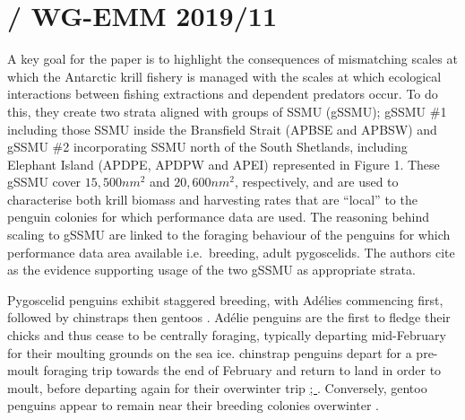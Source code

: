 \documentclass[]{elsarticle} %
\begin{document}
\section{\texorpdfstring{\citet{Watters2020} / WG-EMM
2019/11}{@Watters2020 / WG-EMM 2019/11}}\label{watters2020-wg-emm-201911}

A key goal for the paper is to highlight the consequences of mismatching
scales at which the Antarctic krill fishery is managed with the scales
at which ecological interactions between fishing extractions and
dependent predators occur. To do this, they create two strata aligned
with groups of SSMU (gSSMU); gSSMU \#1 including those SSMU inside the
Bransfield Strait (APBSE and APBSW) and gSSMU \#2 incorporating SSMU
north of the South Shetlands, including Elephant Island (APDPE, APDPW
and APEI) represented in Figure 1. These gSSMU cover \(15,500nm^2\) and
\(20,600nm^2\), respectively, and are used to characterise both krill
biomass and harvesting rates that are ``local'' to the penguin colonies
for which performance data are used. The reasoning behind scaling to
gSSMU are linked to the foraging behaviour of the penguins for which
performance data area available i.e.~breeding, adult pygoscelids. The
authors cite \citet{Hinke2017} as the evidence supporting usage of the
two gSSMU as appropriate strata.

Pygoscelid penguins exhibit staggered breeding, with Adélies commencing
first, followed by chinstraps then gentoos \citep{Black2016}. Adélie
penguins are the first to fledge their chicks and thus cease to be
centrally foraging, typically departing mid-February for their moulting
grounds on the sea ice. chinstrap penguins depart for a pre-moult
foraging trip towards the end of February and return to land in order to
moult, before departing again for their overwinter trip
\href{Figure\%202}{\citet{Hinke2015}; \citet{Hinke2019}}. Conversely,
gentoo penguins appear to remain near their breeding colonies overwinter
\citep{korczak-abshireCoastalRegionsNorthern2021}.
\end{document}
